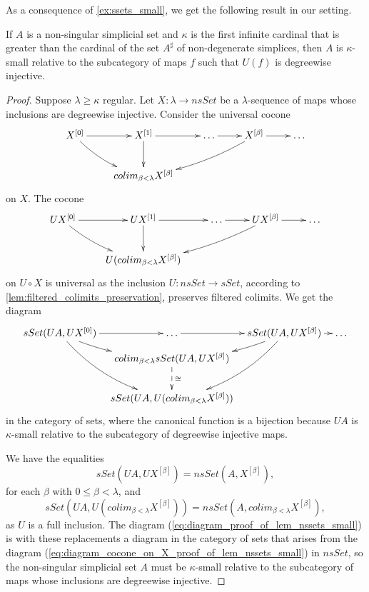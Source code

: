 As a consequence of \cref{ex:ssets_small}, we get the following result in our setting.
\begin{lemma}\label{lem:nssets_small}
If $A$ is a non-singular simplicial set and $\kappa$ is the first infinite cardinal that is greater than the cardinal of the set $A^\sharp$ of non-degenerate simplices, then $A$ is $\kappa$-small relative to the subcategory of maps $f$ such that $U(f)$ is degreewise injective.
\end{lemma}
\begin{proof}
Suppose $\lambda \geq \kappa$ regular. Let $X:\lambda \to nsSet$ be a $\lambda$-sequence of maps whose inclusions are degreewise injective. Consider the universal cocone
\begin{equation}
\label{eq:diagram_cocone_on_X_proof_of_lem_nssets_small}
\begin{gathered}
\xymatrix{
X^{[0]} \ar@/_/[dr] \ar[r] & X^{[1]} \ar[d] \ar[r] & \dots \ar[r] & X^{[\beta ]} \ar@/^/[lld] \ar[r] & \dots \\
& colim_{\beta <\lambda }X^{[\beta ]}
}
\end{gathered}
\end{equation}
on $X$. The cocone
\begin{displaymath}
\xymatrix{
UX^{[0]} \ar@/_/[dr] \ar[r] & UX^{[1]} \ar[d] \ar[r] & \dots \ar[r] & UX^{[\beta ]} \ar@/^/[lld] \ar[r] & \dots \\
& U(colim_{\beta <\lambda }X^{[\beta ]} )
}
\end{displaymath}
on $U\circ X$ is universal as the inclusion $U:nsSet\to sSet$, according to \cref{lem:filtered_colimits_preservation}, preserves filtered colimits. We get the diagram
\begin{equation}
\label{eq:diagram_proof_of_lem_nssets_small}
\begin{gathered}
\xymatrix@=0.8em{
sSet(UA,UX^{[0]}) \ar@/_1pc/[dddr] \ar@/_/[dr] \ar[r] & \dots \ar[r] & sSet(UA,UX^{[\beta ]}) \ar@/^/[ld] \ar@/^1pc/[lddd] \ar[r] & \dots \\
& colim _{\beta <\lambda }sSet(UA,UX^{[\beta ]}) \ar@{-->}[dd]^\cong \\
\\
& sSet(UA,U(colim_{\beta <\lambda }X^{[\beta ]}))
}
\end{gathered}
\end{equation}
in the category of sets, where the canonical function is a bijection because $UA$ is $\kappa$-small relative to the subcategory of degreewise injective maps.

We have the equalities
\[sSet(UA,UX^{[\beta ]})=nsSet(A,X^{[\beta ]}),\]
for each $\beta$ with $0\leq \beta <\lambda$, and
\[sSet(UA,U(colim_{\beta <\lambda }X^{[\beta ]}))=nsSet(A,colim_{\beta <\lambda }X^{[\beta ]}),\]
as $U$ is a full inclusion. The diagram (\ref{eq:diagram_proof_of_lem_nssets_small}) is with these replacements a diagram in the category of sets that arises from the diagram (\ref{eq:diagram_cocone_on_X_proof_of_lem_nssets_small}) in $nsSet$, so the non-singular simplicial set $A$ must be $\kappa$-small relative to the subcategory of maps whose inclusions are degreewise injective.
\end{proof}
